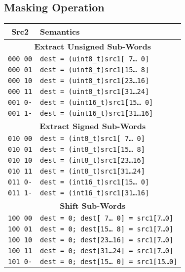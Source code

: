 \documentclass[10pt,DIV12]{scrartcl}
\begin{document}
\pagebreak
\subsection{Masking Operation}
\label{sec:mask}

\begin{tabular}{cl}
\toprule
Src2 & Semantics \\
\midrule
\multicolumn{2}{c}{\textsf{\textbf{Extract Unsigned Sub-Words}}} \\
\cmidrule{1-2}
\texttt{000 00} & \texttt{dest = (uint8\_t)src1[ 7\ldots{}\ 0]} \\
\texttt{000 01} & \texttt{dest = (uint8\_t)src1[15\ldots{}\ 8]} \\
\texttt{000 10} & \texttt{dest = (uint8\_t)src1[23\ldots{}16]} \\
\texttt{000 11} & \texttt{dest = (uint8\_t)src1[31\ldots{}24]} \\
\cmidrule{1-2}
\texttt{001 0-} & \texttt{dest = (uint16\_t)src1[15\ldots{}\ 0]} \\
\texttt{001 1-} & \texttt{dest = (uint16\_t)src1[31\ldots{}16]} \\
\midrule
\multicolumn{2}{c}{\textsf{\textbf{Extract Signed Sub-Words}}} \\
\cmidrule{1-2}
\texttt{010 00} & \texttt{dest = (int8\_t)src1[ 7\ldots{}\ 0]} \\
\texttt{010 01} & \texttt{dest = (int8\_t)src1[15\ldots{}\ 8]} \\
\texttt{010 10} & \texttt{dest = (int8\_t)src1[23\ldots{}16]} \\
\texttt{010 11} & \texttt{dest = (int8\_t)src1[31\ldots{}24]} \\
\cmidrule{1-2}
\texttt{011 0-} & \texttt{dest = (int16\_t)src1[15\ldots{}\ 0]} \\
\texttt{011 1-} & \texttt{dest = (int16\_t)src1[31\ldots{}16]} \\
\midrule
\multicolumn{2}{c}{\textsf{\textbf{Shift Sub-Words}}} \\
\cmidrule{1-2}
\texttt{100 00} & \texttt{dest = 0; dest[ 7\ldots{}\ 0] = src1[7\ldots{}0]} \\
\texttt{100 01} & \texttt{dest = 0; dest[15\ldots{}\ 8] = src1[7\ldots{}0]} \\
\texttt{100 10} & \texttt{dest = 0; dest[23\ldots{}16] = src1[7\ldots{}0]} \\
\texttt{100 11} & \texttt{dest = 0; dest[31\ldots{}24] = src1[7\ldots{}0]} \\
\cmidrule{1-2}
\texttt{101 0-} & \texttt{dest = 0; dest[15\ldots{}\ 0] = src1[15\ldots{}0]} \\

\end{tabular}
\end{document}
